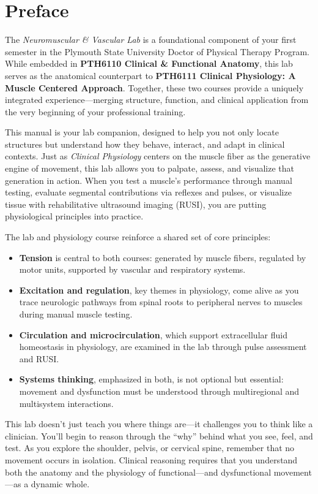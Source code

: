 \chapter*{Preface}

The \textit{Neuromuscular \& Vascular Lab} is a foundational component of your first semester in the Plymouth State University Doctor of Physical Therapy Program. While embedded in \textbf{PTH6110 Clinical \& Functional Anatomy}, this lab serves as the anatomical counterpart to \textbf{PTH6111 Clinical Physiology: A Muscle Centered Approach}. Together, these two courses provide a uniquely integrated experience—merging structure, function, and clinical application from the very beginning of your professional training.

This manual is your lab companion, designed to help you not only locate structures but understand how they behave, interact, and adapt in clinical contexts. Just as \textit{Clinical Physiology} centers on the muscle fiber as the generative engine of movement, this lab allows you to palpate, assess, and visualize that generation in action. When you test a muscle’s performance through manual testing, evaluate segmental contributions via reflexes and pulses, or visualize tissue with rehabilitative ultrasound imaging (RUSI), you are putting physiological principles into practice.

The lab and physiology course reinforce a shared set of core principles:
\begin{itemize}
    \item \textbf{Tension} is central to both courses: generated by muscle fibers, regulated by motor units, supported by vascular and respiratory systems.
    \item \textbf{Excitation and regulation}, key themes in physiology, come alive as you trace neurologic pathways from spinal roots to peripheral nerves to muscles during manual muscle testing.
    \item \textbf{Circulation and microcirculation}, which support extracellular fluid homeostasis in physiology, are examined in the lab through pulse assessment and RUSI.
    \item \textbf{Systems thinking}, emphasized in both, is not optional but essential: movement and dysfunction must be understood through multiregional and multisystem interactions.
\end{itemize}

This lab doesn’t just teach you where things are—it challenges you to think like a clinician. You'll begin to reason through the “why” behind what you see, feel, and test. As you explore the shoulder, pelvis, or cervical spine, remember that no movement occurs in isolation. Clinical reasoning requires that you understand both the anatomy and the physiology of functional—and dysfunctional movement—as a dynamic whole.

